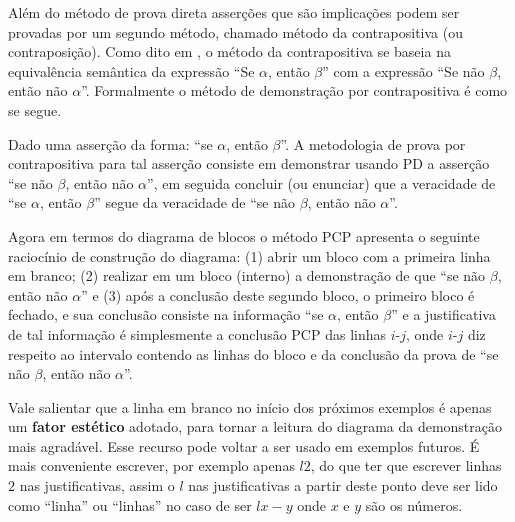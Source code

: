 Além do método de prova direta asserções que são implicações podem ser provadas por um segundo método, chamado método da contrapositiva (ou contraposição). Como dito em \cite{menezes2010MD}, o método da contrapositiva se baseia na equivalência semântica da expressão ``Se $\alpha$, então $\beta$'' com a expressão ``Se não $\beta$, então não $\alpha$''. Formalmente o método de demonstração por contrapositiva é como se segue.

\begin{definicao}
	Dado uma asserção da forma: ``se $\alpha$, então $\beta$''. A metodologia de prova por contrapositiva para tal asserção consiste em demonstrar usando PD a asserção ``se não $\beta$, então não $\alpha$'', em seguida concluir (ou enunciar) que a veracidade de ``se $\alpha$, então $\beta$'' segue da veracidade de ``se não $\beta$, então não $\alpha$''.
\end{definicao}

Agora em termos do diagrama de blocos o método PCP apresenta o seguinte raciocínio de construção do diagrama: (1) abrir um bloco com a primeira linha em branco; (2) realizar em um bloco (interno) a  demonstração  de que ``se não $\beta$, então não $\alpha$'' e (3) após a conclusão deste segundo bloco, o primeiro bloco é fechado, e sua conclusão consiste na informação ``se $\alpha$, então $\beta$'' e a justificativa de tal informação é simplesmente a conclusão PCP das linhas $i$-$j$, onde $i$-$j$ diz respeito ao intervalo contendo as  linhas do bloco e da conclusão da prova de ``se não $\beta$, então não $\alpha$''.

\begin{atencao}
  Vale salientar que a linha em branco no início dos próximos exemplos é apenas um \textbf{fator estético} adotado, para tornar a leitura do diagrama da demonstração mais agradável. Esse recurso pode voltar a ser usado em exemplos futuros. É mais conveniente escrever, por exemplo apenas $l2$, do que ter que escrever linhas $2$ nas justificativas, assim o $l$ nas justificativas a partir deste ponto deve ser lido como ``linha'' ou ``linhas'' no caso de ser $lx-y$ onde $x$ e $y$ são os números.
\end{atencao}

